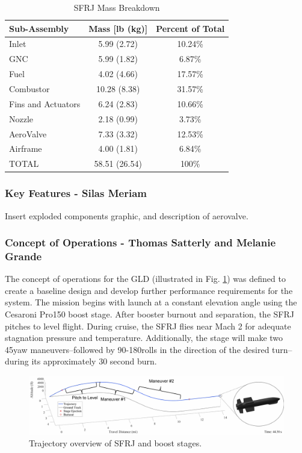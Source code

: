 \begin{table}[H]
\centering
\caption{SFRJ Mass Breakdown}
\label{tab:masses}
\begin{tabular}{l|c|c}
\textbf{Sub-Assembly} & \textbf{Mass [lb (kg)]} & \textbf{Percent of Total} \\
\hline
Inlet & 5.99 (2.72) & 10.24\% \\
GNC & 5.99 (1.82) & 6.87\% \\
Fuel & 4.02 (4.66) & 17.57\% \\
Combustor & 10.28 (8.38) & 31.57\% \\
Fins and Actuators & 6.24 (2.83) & 10.66\% \\
Nozzle & 2.18 (0.99) & 3.73\% \\
AeroValve & 7.33 (3.32) & 12.53\% \\
Airframe & 4.00 (1.81) & 6.84\% \\
\hline
TOTAL & 58.51  (26.54) & 100\% \\
\end{tabular}
\end{table}

\subsubsection{Key Features - Silas Meriam}
Insert exploded components graphic, and description of aerovalve.

\subsubsection{Concept of Operations - Thomas Satterly and Melanie Grande}
The concept of operations for the GLD (illustrated in Fig. \ref{fig:trajectoryOverview}) was defined to create a baseline design and develop further performance requirements for the system. The mission begins with launch at a constant elevation angle using the Cesaroni Pro150 boost stage. After booster burnout and separation, the SFRJ pitches to level flight. During cruise, the SFRJ flies near Mach 2 for adequate stagnation pressure and temperature. Additionally, the stage will make two 45\textdegree yaw maneuvers--followed by 90-180\textdegree rolls in the direction of the desired turn--during its approximately 30 second burn.

\begin{figure}[H]
    \centering
    \includegraphics[width=\textwidth]{OverviewFigures/TrajectoryOverview.png}
    \caption{Trajectory overview of SFRJ and boost stages.}
    \label{fig:trajectoryOverview}
\end{figure}

